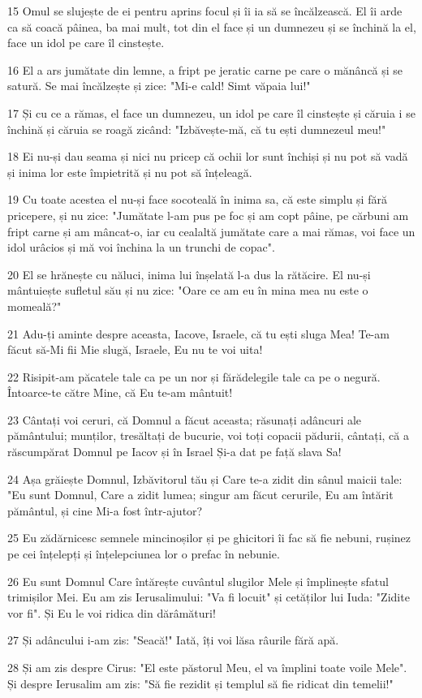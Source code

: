 \par 15 Omul se slujește de ei pentru aprins focul și îi ia să se încălzească. El îi arde ca să coacă pâinea, ba mai mult, tot din el face și un dumnezeu și se închină la el, face un idol pe care îl cinstește.
\par 16 El a ars jumătate din lemne, a fript pe jeratic carne pe care o mănâncă și se satură. Se mai încălzește și zice: "Mi-e cald! Simt văpaia lui!"
\par 17 Și cu ce a rămas, el face un dumnezeu, un idol pe care îl cinstește și căruia i se închină și căruia se roagă zicând: "Izbăvește-mă, că tu ești dumnezeul meu!"
\par 18 Ei nu-și dau seama și nici nu pricep că ochii lor sunt închiși și nu pot să vadă și inima lor este împietrită și nu pot să înțeleagă.
\par 19 Cu toate acestea el nu-și face socoteală în inima sa, că este simplu și fără pricepere, și nu zice: "Jumătate l-am pus pe foc și am copt pâine, pe cărbuni am fript carne și am mâncat-o, iar cu cealaltă jumătate care a mai rămas, voi face un idol urâcios și mă voi închina la un trunchi de copac".
\par 20 El se hrănește cu năluci, inima lui înșelată l-a dus la rătăcire. El nu-și mântuiește sufletul său și nu zice: "Oare ce am eu în mina mea nu este o momeală?"
\par 21 Adu-ți aminte despre aceasta, Iacove, Israele, că tu ești sluga Mea! Te-am făcut să-Mi fii Mie slugă, Israele, Eu nu te voi uita!
\par 22 Risipit-am păcatele tale ca pe un nor și fărădelegile tale ca pe o negură. Întoarce-te către Mine, că Eu te-am mântuit!
\par 23 Cântați voi ceruri, că Domnul a făcut aceasta; răsunați adâncuri ale pământului; munților, tresăltați de bucurie, voi toți copacii pădurii, cântați, că a răscumpărat Domnul pe Iacov și în Israel Și-a dat pe față slava Sa!
\par 24 Așa grăiește Domnul, Izbăvitorul tău și Care te-a zidit din sânul maicii tale: "Eu sunt Domnul, Care a zidit lumea; singur am făcut cerurile, Eu am întărit pământul, și cine Mi-a fost într-ajutor?
\par 25 Eu zădărnicesc semnele mincinoșilor și pe ghicitori îi fac să fie nebuni, rușinez pe cei înțelepți și înțelepciunea lor o prefac în nebunie.
\par 26 Eu sunt Domnul Care întărește cuvântul slugilor Mele și împlinește sfatul trimișilor Mei. Eu am zis Ierusalimului: "Va fi locuit" și cetăților lui Iuda: "Zidite vor fi". Și Eu le voi ridica din dărâmături!
\par 27 Și adâncului i-am zis: "Seacă!" Iată, îți voi lăsa râurile fără apă.
\par 28 Și am zis despre Cirus: "El este păstorul Meu, el va împlini toate voile Mele". Și despre Ierusalim am zis: "Să fie rezidit și templul să fie ridicat din temelii!"

